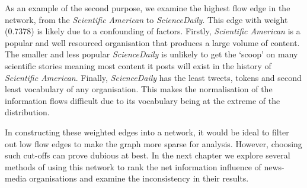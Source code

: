As an example of the second purpose, we examine the highest flow edge in the network, from the \emph{Scientific American} to \emph{ScienceDaily}.  This edge with weight (0.7378) is likely due to a confounding of factors. Firstly, \emph{Scientific American} is a popular and well resourced organisation that produces a large volume of content. The smaller and less popular \emph{ScienceDaily} is unlikely to get the `scoop' on many scientific stories meaning most content it posts will exist in the history of \emph{Scientific American}. Finally, \emph{ScienceDaily} has the least tweets, tokens and second least vocabulary of any organisation. This makes the normalisation of the information flows difficult due to its vocabulary being at the extreme of the distribution. 

In constructing these weighted edges into a network, it would be ideal to filter out low flow edges to make the graph more sparse for analysis. However, choosing such cut-offs can prove dubious at best. In the next chapter we explore several methods of using this network to rank the net information influence of news-media organisations and examine the inconsistency in their results.

